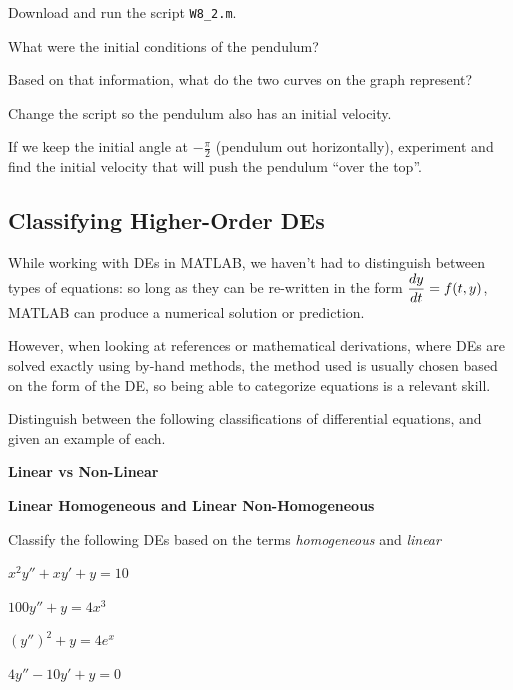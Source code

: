 \problem Download and run the script \texttt{W8\_2.m}.

\vsc

\problem What were the initial conditions of the pendulum?

\vfill

\problem Based on that information, what do the two curves on the graph
  represent?

\vfill

\newpage

\problem Change the script so the pendulum also has an initial velocity.

\vsc

\problem If we keep the initial angle at $-\frac{\pi}{2}$ (pendulum
  out horizontally), experiment and find the initial velocity that
  will push the pendulum ``over the top''.

\newpage

\subsection*{Classifying Higher-Order DEs}

While working with DEs in MATLAB, we haven't had to distinguish
between types of equations: so long as they can be re-written in the
form $\displaystyle \frac{dy}{dt} = f(t, y)$, MATLAB can produce a numerical
solution or prediction.

However, when looking at references or mathematical derivations, where
DEs are solved exactly using by-hand methods, the method used is
usually chosen based on the form of the DE, so being able to
categorize equations is a relevant skill.

\newpage

\problem Distinguish between the following classifications of
differential equations, and given an example of each.

{\bf Linear vs Non-Linear}
\vfill

{\bf Linear Homogeneous and Linear Non-Homogeneous}
\vfill


 

\newpage 
Classify the following DEs based on the terms {\em homogeneous} and
{\em linear} \vfill

$x^2 y'' + x y' + y = 10$ \vfill

 $ 100 y'' +  y = 4x^3$
 \vfill

 $ (y'')^2 + y = 4 e^{x}$
 \vfill

 $ 4 y'' - 10 y' + y = 0 $
 \vfill






